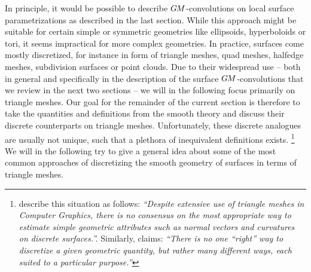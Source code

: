 In principle, it would be possible to describe $G\mkern-1.4muM$-convolutions on local surface parametrizations as described in the last section.
While this approach might be suitable for certain simple or symmetric geometries like ellipsoids, hyperboloids or tori, it seems impractical for more complex geometries.
In practice, surfaces come mostly discretized, for instance in form of triangle meshes, quad meshes, halfedge meshes, subdivision surfaces or point clouds.
Due to their widespread use -- both in general and specifically in the description of the surface $G\mkern-1.4muM$-convolutions that we review in the next two sections -- we will in the following focus primarily on triangle meshes.
Our goal for the remainder of the current section is therefore to take the quantities and definitions from the smooth theory and discuss their discrete counterparts on triangle meshes.
Unfortunately, these discrete analogues are usually not unique, such that a plethora of inequivalent definitions exists.%
\footnote{
    \citet{meyer2003discrete} describe this situation as follows:
    \emph{``Despite extensive use of triangle meshes in Computer Graphics, there is no consensus on the most appropriate way to estimate simple geometric attributes such as normal vectors and curvatures on discrete surfaces.''.}
    Similarly, \citet{craneDiscreteDifferentialGeometry2014} claims:
    \emph{``There is no one “right” way to discretize a given geometric quantity, but rather many different ways, each suited to a particular purpose.''}
}
We will in the following try to give a general idea about some of the most common approaches of discretizing the smooth geometry of surfaces in terms of triangle meshes.


